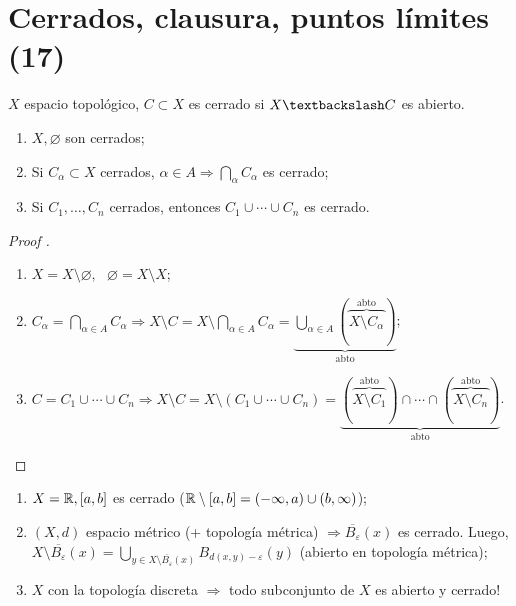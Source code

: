 
\section{Cerrados, clausura, puntos límites (17)}

\begin{definition}
	$X$ espacio topológico, $C \subset X$ es cerrado si $X \textbackslash C$ es abierto. 
\end{definition}

\begin{lemma}
	\text{}
	\begin{enumerate}
		\item $X, \varnothing$ son cerrados;

		\item Si $C_{\alpha} \subset X$ cerrados, $\alpha \in A \Rightarrow \bigcap_{\alpha} C_{\alpha}$ es cerrado;

		\item Si $C_1, \dots, C_n$ cerrados, entonces $C_1 \cup \cdots \cup C_n$ es cerrado.
	\end{enumerate}
\end{lemma}

\begin{proof}[Proof ]
	\text{}
	\begin{enumerate}
		\item $X = X \setminus \varnothing, \text{ } \varnothing = X \setminus X$;

		\item $C_{\alpha} = \displaystyle\bigcap_{\alpha \in A} C_{\alpha} \Rightarrow X \setminus C = X \setminus \displaystyle\bigcap_{\alpha \in A} C_{\alpha} = \underbrace{\displaystyle\bigcup_{\alpha \in A} (\overbrace{X \setminus C_{\alpha}}^{\text{abto}})}_{\text{abto}}$;

		\item $C = C_1 \cup \cdots \cup C_n \Rightarrow X \setminus C = X \setminus (C_1 \cup \cdots \cup C_n) = \underbrace{(\overbrace{X \setminus C_1}^{\text{abto}}) \cap \cdots \cap (\overbrace{X \setminus C_n}^{\textrm{abto}})}_{\text{abto}}$.
	\end{enumerate}
\end{proof}

\begin{eg}
	\text{}
	\begin{enumerate}
		\item $X = \mathbb{R}, [a,b]$ es cerrado ($\mathbb{R} \setminus [a,b] = (-\infty, a) \cup (b, \infty)$);

		\item $(X,d)$ espacio métrico (+ topología métrica) $\Rightarrow \overline{B_{\varepsilon}} (x)$ es cerrado. Luego, $X \setminus \overline{B_{\varepsilon}} (x) = \bigcup_{y \in X \setminus \displaystyle\overline{B_{\varepsilon}} (x)} B_{d(x,y)-\varepsilon} (y)$ (abierto en topología métrica);

		\item $X$ con la topología discreta $\Rightarrow$ todo subconjunto de $X$ es abierto y cerrado!
	\end{enumerate}
\end{eg}

